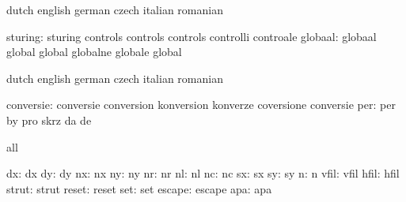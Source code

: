 \stopvariables

\startconstants            dutch                     english
                           german                    czech
                           italian                   romanian

                  sturing: sturing                   controls
                           controls                  controls
                           controlli                  controale
                  globaal: globaal                   global
                           global                    globalne
                           globale                   global

\stopconstants





\startvariables            dutch                     english
                           german                    czech
                           italian                   romanian

                conversie: conversie                 conversion
                           konversion                konverze
                           coversione                conversie
                      per: per                       by
                           pro                       skrz
                           da                        de

\stopvariables




\startconstants            all

                       dx: dx
                       dy: dy
                       nx: nx
                       ny: ny
                       nr: nr
                       nl: nl
                       nc: nc
                       sx: sx
                       sy: sy
                        n: n
                     vfil: vfil
                     hfil: hfil
                    strut: strut
                    reset: reset
                      set: set
                   escape: escape
                      apa: apa

